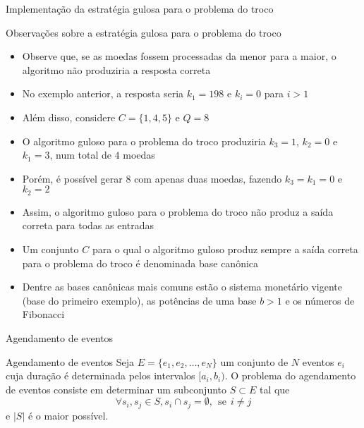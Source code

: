 \begin{frame}[fragile]{Implementação da estratégia gulosa para o problema do troco}
\end{frame}

\begin{frame}[fragile]{Observações sobre a estratégia gulosa para o problema do troco}

    \begin{itemize}
        \item Observe que, se as moedas fossem processadas da menor para a maior, o algoritmo
            não produziria a resposta correta

        \item No exemplo anterior, a resposta seria $k_1 = 198$ e $k_i = 0$ para $i > 1$

        \item Além disso, considere $C = \lbrace 1, 4, 5\rbrace$ e $Q = 8$

        \item O algoritmo guloso para o problema do troco produziria $k_3 = 1$, $k_2 = 0$ e 
            $k_1 = 3$, num total de $4$ moedas

        \item Porém, é possível gerar $8$ com apenas duas moedas, fazendo $k_3 = k_1 = 0$ e 
            $k_2 = 2$

        \item Assim, o algoritmo guloso para o problema do troco não produz a saída correta para
            todas as entradas

        \item Um conjunto $C$ para o qual o algoritmo guloso produz sempre a saída correta 
        para o problema do troco é
            denominada base canônica

        \item Dentre as bases canônicas mais comuns estão o sistema monetário vigente (base do
            primeiro exemplo), as potências de uma base $b > 1$ e os números de Fibonacci
        
    \end{itemize}

\end{frame}

\begin{frame}[fragile]{Agendamento de eventos}

    \begin{block}{Agendamento de eventos}
        Seja $E = \lbrace e_1, e_2, \ldots, e_N\rbrace$ um conjunto de $N$ eventos $e_i$ cuja
            duração é determinada pelos intervalos $[a_i, b_i)$. O problema do agendamento de
            eventos consiste em determinar um subconjunto $S\subset E$ tal que
        \[
            \forall s_i, s_j\in S, s_i \cap s_j = \emptyset, \ \ \mbox{se}\ \ i\neq j
        \]
        e $|S|$ é o maior possível.
    \end{block}

\end{frame}

